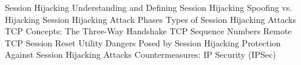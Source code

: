 Session Hijacking
	Understanding and Defining Session Hijacking
	Spoofing vs. Hijacking
	Session Hijacking Attack Phases
	Types of Session Hijacking Attacks
	TCP Concepts: The Three-Way Handshake
	TCP Sequence Numbers
	Remote TCP Session Reset Utility
	Dangers Posed by Session Hijacking
	Protection Against Session Hijacking Attacks
	Countermeasures: IP Security (IPSec)